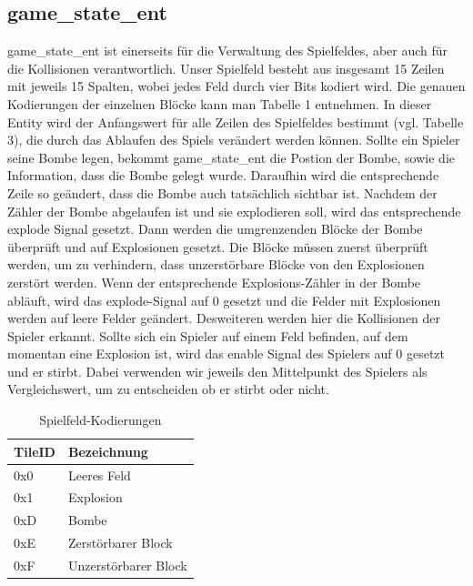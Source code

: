 \documentclass[parskip=full]{scrartcl}
\begin{document}
			\subsection{game\_state\_ent}
				game\_state\_ent ist einerseits für die Verwaltung des Spielfeldes, aber auch für die Kollisionen verantwortlich. Unser Spielfeld besteht aus insgesamt 15 Zeilen mit jeweils 15 Spalten, wobei jedes Feld durch vier Bits kodiert wird. Die genauen Kodierungen der einzelnen Blöcke kann man Tabelle 1 entnehmen. In dieser Entity wird der Anfangswert für alle Zeilen des Spielfeldes bestimmt (vgl. Tabelle 3), die durch das Ablaufen des Spiels verändert werden können. \newline
				Sollte ein Spieler seine Bombe legen, bekommt game\_state\_ent die Postion der Bombe, sowie die Information, dass die Bombe gelegt wurde. Daraufhin wird die entsprechende Zeile so geändert, dass die Bombe auch tatsächlich sichtbar ist. Nachdem der Zähler der Bombe abgelaufen ist und sie explodieren soll, wird das entsprechende explode Signal gesetzt. Dann werden die umgrenzenden Blöcke der Bombe überprüft und auf Explosionen gesetzt. Die Blöcke müssen zuerst überprüft werden, um zu verhindern, dass unzerstörbare Blöcke von den Explosionen zerstört werden. Wenn der entsprechende Explosions-Zähler in der Bombe abläuft, wird das explode-Signal auf 0 gesetzt und die Felder mit Explosionen werden auf leere Felder geändert. \newline
				Desweiteren werden hier die Kollisionen der Spieler erkannt. Sollte sich ein Spieler auf einem Feld befinden, auf dem momentan eine Explosion ist, wird das enable Signal des Spielers auf 0 gesetzt und er stirbt. Dabei verwenden wir jeweils den Mittelpunkt des Spielers als Vergleichswert, um zu entscheiden ob er stirbt oder nicht. \newline
				
				\begin{table}[H]
					\centering
					\label{tileCode}
					\begin{tabular}{|l|l|}
						\hline
						\textbf{TileID} & \textbf{Bezeichnung}      \\ \hline
						0x0           & Leeres Feld               \\ \hline
						0x1           & Explosion                 \\ \hline
						0xD           & Bombe                     \\ \hline
						0xE           & Zerstörbarer Block        \\ \hline
						0xF           & Unzerstörbarer Block      \\ \hline
					\end{tabular}
					\caption{Spielfeld-Kodierungen}
				\end{table}
				
\end{document}
